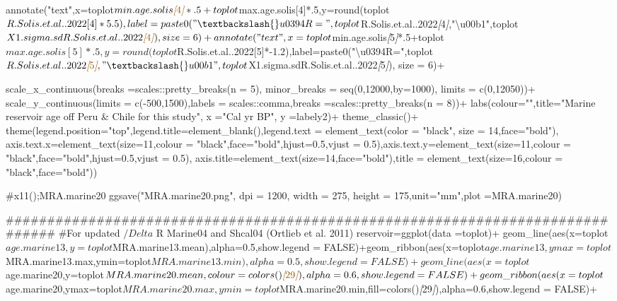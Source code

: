 \documentclass[
]{article}
\newenvironment{Shaded}{\begin{snugshade}}{\end{snugshade}}
\newcommand{\CommentTok}[1]{\textcolor[rgb]{0.56,0.35,0.01}{\textit{#1}}}
\newcommand{\NormalTok}[1]{#1}
\newcommand{\OtherTok}[1]{\textcolor[rgb]{0.56,0.35,0.01}{#1}}
\begin{document}
\begin{Shaded}
\begin{Highlighting}[]
\NormalTok{  annotate("text",x=toplot$min.age.solis}\CommentTok{[}\OtherTok{4}\CommentTok{]}\NormalTok{*.5+toplot$max.age.solis[4]*.5,y=round(toplot$R.Solis.et.al..2022[4]*5.5),label=paste0("\textbackslash{}u0394R=",toplot$R.Solis.et.al..2022}\CommentTok{[}\OtherTok{4}\CommentTok{]}\NormalTok{,"\textbackslash{}u00b1",toplot$X1.sigma.sdR.Solis.et.al..2022}\CommentTok{[}\OtherTok{4}\CommentTok{]}\NormalTok{), size = 6)+}
\NormalTok{  annotate("text",x=toplot$min.age.solis}\CommentTok{[}\OtherTok{5}\CommentTok{]}\NormalTok{*.5+toplot$max.age.solis[5]*.5,y=round(toplot$R.Solis.et.al..2022[5]*{-}1.2),label=paste0("\textbackslash{}u0394R=",toplot$R.Solis.et.al..2022}\CommentTok{[}\OtherTok{5}\CommentTok{]}\NormalTok{,"\textbackslash{}u00b1",toplot$X1.sigma.sdR.Solis.et.al..2022}\CommentTok{[}\OtherTok{5}\CommentTok{]}\NormalTok{), size = 6)+}
  
\NormalTok{  scale\_x\_continuous(breaks =scales::pretty\_breaks(n = 5),}
\NormalTok{                   minor\_breaks = seq(0,12000,by=1000),}
\NormalTok{                   limits = c(0,12050))+}
\NormalTok{  scale\_y\_continuous(limits = c({-}500,1500),labels = scales::comma,breaks =scales::pretty\_breaks(n = 8))+}
\NormalTok{  labs(colour="",title="Marine reservoir age off Peru \& Chile for this study",}
\NormalTok{       x ="Cal yr BP", }
\NormalTok{       y =labely2)+}
\NormalTok{  theme\_classic()+}
\NormalTok{  theme(legend.position="top",legend.title=element\_blank(),legend.text = element\_text(color = "black", size = 14,face="bold"),}
\NormalTok{        axis.text.x=element\_text(size=11,colour = "black",face="bold",hjust=0.5,vjust = 0.5),axis.text.y=element\_text(size=11,colour = "black",face="bold",hjust=0.5,vjust = 0.5),}
\NormalTok{        axis.title=element\_text(size=14,face="bold"),title = element\_text(size=16,colour = "black",face="bold"))}

\NormalTok{\#x11();MRA.marine20}
\NormalTok{ggsave("MRA.marine20.png", dpi = 1200,   width = 275,}
\NormalTok{       height = 175,unit="mm",plot =MRA.marine20)}

\NormalTok{\#\#\#\#\#\#\#\#\#\#\#\#\#\#\#\#\#\#\#\#\#\#\#\#\#\#\#\#\#\#\#\#\#\#\#\#\#\#\#\#\#\#\#\#\#\#\#\#\#\#\#\#\#\#\#\#\#\#\#\#\#\#\#\#\#\#\#\#\#\#\#\#\#\#\#\#\#\#\#}
\NormalTok{\#For updated $/Delta$ R Marine04 and Shcal04 (Ortlieb et al. 2011)}
\NormalTok{reservoir=ggplot(data =toplot)+}
\NormalTok{  geom\_line(aes(x=toplot$age.marine13,y=toplot$MRA.marine13.mean),alpha=0.5,show.legend = FALSE)+geom\_ribbon(aes(x=toplot$age.marine13,ymax=toplot$MRA.marine13.max,ymin=toplot$MRA.marine13.min),alpha=0.5,show.legend = FALSE)+}
\NormalTok{  geom\_line(aes(x=toplot$age.marine20,y=toplot$MRA.marine20.mean,colour=colors()}\CommentTok{[}\OtherTok{29}\CommentTok{]}\NormalTok{),alpha=0.6,show.legend = FALSE)+geom\_ribbon(aes(x=toplot$age.marine20,ymax=toplot$MRA.marine20.max,ymin=toplot$MRA.marine20.min,fill=colors()}\CommentTok{[}\OtherTok{29}\CommentTok{]}\NormalTok{),alpha=0.6,show.legend = FALSE)+}
  

\end{Highlighting}
\end{Shaded}
\end{document}
